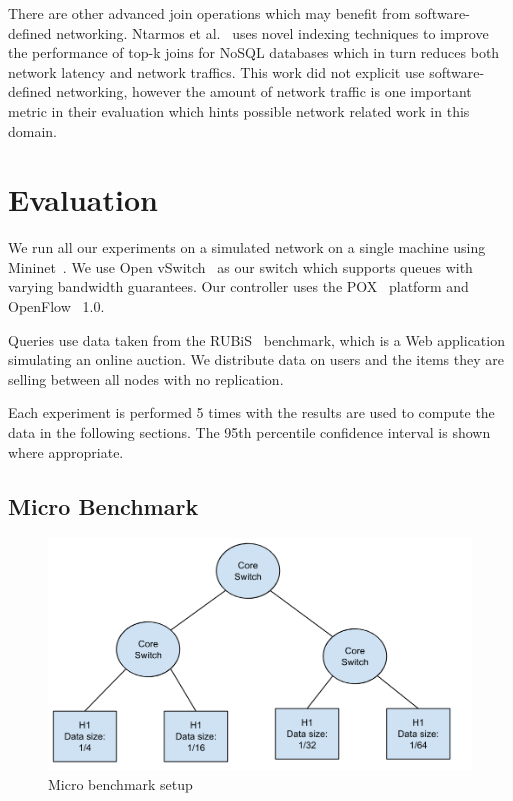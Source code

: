 \documentclass{sig-alternate-2013}
\begin{document}
There are other advanced join operations which may benefit from software-defined
networking. Ntarmos et al.~\cite{Ntarmos2014} uses novel indexing techniques to
improve the performance of top-k joins for NoSQL databases which in turn
reduces both network latency and network traffics. This work did not explicit
use software-defined networking, however the amount of network traffic is one
important metric in their evaluation which hints possible network related
work in this domain.

\section{Evaluation}

We run all our experiments on a simulated network on a single machine using Mininet~\cite{Lantz2010}.
We use Open vSwitch~\cite{Pfaff2009} as our switch which supports queues with varying bandwidth guarantees.
Our controller uses the POX~\cite{Gude2008} platform and OpenFlow~\cite{McKeown2008} 1.0.

Queries use data taken from the RUBiS~\cite{Cecchet2002} benchmark, which is a Web application simulating an online auction.
We distribute data on users and the items they are selling between all nodes with no replication.

Each experiment is performed 5 times with the results are used to compute the data in the following sections.
The 95th percentile confidence interval is shown where appropriate.

\subsection{Micro Benchmark}
\begin{figure}
    \centering
    \includegraphics[scale=2.5]{figures/Join_micro_benchmark.png}
    \caption{Micro benchmark setup}\label{fig:micro_benchmark}
\end{figure}
\end{document}
